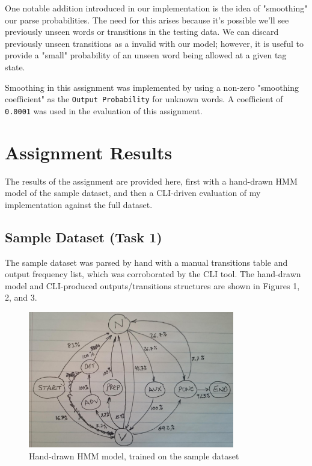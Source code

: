 \documentclass[11pt]{article}
\begin{document}
One notable addition introduced in our implementation is the idea of "smoothing"
our parse probabilities.  The need for this arises because it's possible we'll
see previously unseen words or transitions in the testing data.  We can discard
previously unseen transitions as a invalid with our model; however, it is useful
to provide a "small" probability of an unseen word being allowed at a given tag
state.

Smoothing in this assignment was implemented by using a non-zero "smoothing coefficient"
as the \texttt{Output Probability} for unknown words.  A coefficient of \texttt{0.0001} was used
in the evaluation of this assignment.


\section{Assignment Results}
The results of the assignment are provided here, first with a hand-drawn HMM model of the sample
dataset, and then a CLI-driven evaluation of my implementation against the full dataset.

\subsection{Sample Dataset (Task 1)}
The sample dataset was parsed by hand with a manual transitions table and output frequency list,
which was corroborated by the CLI tool.  The hand-drawn model and CLI-produced outputs/transitions
structures are shown in Figures 1, 2, and 3.

\begin{figure}[ht!]
    \centering
    \includegraphics[width=90mm]{img/sample_hmm.jpg}
    \caption{Hand-drawn HMM model, trained on the sample dataset}
    \label{fig:sampleHmm}
\end{figure}
\end{document}
